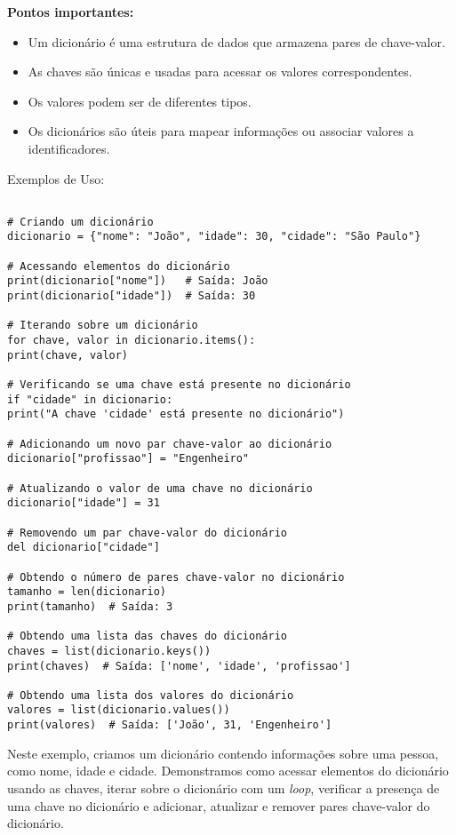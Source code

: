 \documentclass[a4paper, 12pt, onecolumn,singlespacing]{article}
\begin{document}
	\textbf{Pontos importantes:}
	\begin{itemize}
		\item Um dicionário é uma estrutura de dados que armazena pares de chave-valor.
		\item As chaves são únicas e usadas para acessar os valores correspondentes.
		\item Os valores podem ser de diferentes tipos.
		\item Os dicionários são úteis para mapear informações ou associar valores a identificadores.
	\end{itemize}
	Exemplos de Uso:
	
	\begin{verbatim}

# Criando um dicionário
dicionario = {"nome": "João", "idade": 30, "cidade": "São Paulo"}

# Acessando elementos do dicionário
print(dicionario["nome"])   # Saída: João
print(dicionario["idade"])  # Saída: 30

# Iterando sobre um dicionário
for chave, valor in dicionario.items():
print(chave, valor)

# Verificando se uma chave está presente no dicionário
if "cidade" in dicionario:
print("A chave 'cidade' está presente no dicionário")

# Adicionando um novo par chave-valor ao dicionário
dicionario["profissao"] = "Engenheiro"

# Atualizando o valor de uma chave no dicionário
dicionario["idade"] = 31

# Removendo um par chave-valor do dicionário
del dicionario["cidade"]

# Obtendo o número de pares chave-valor no dicionário
tamanho = len(dicionario)
print(tamanho)  # Saída: 3

# Obtendo uma lista das chaves do dicionário
chaves = list(dicionario.keys())
print(chaves)  # Saída: ['nome', 'idade', 'profissao']

# Obtendo uma lista dos valores do dicionário
valores = list(dicionario.values())
print(valores)  # Saída: ['João', 31, 'Engenheiro']

	\end{verbatim}
Neste exemplo, criamos um dicionário contendo informações sobre uma pessoa, como nome, idade e cidade. Demonstramos como acessar elementos do dicionário usando as chaves, iterar sobre o dicionário com um \textit{loop}, verificar a presença de uma chave no dicionário e adicionar, atualizar e remover pares chave-valor do dicionário.
\end{document}

